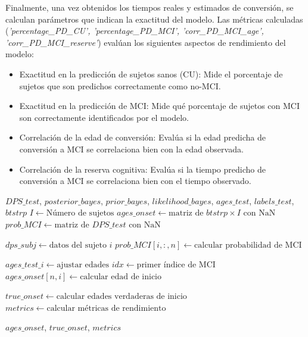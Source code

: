 Finalmente, una vez obtenidos los tiempos reales y estimados de conversión, se calculan parámetros que indican la exactitud del modelo. Las métricas calculadas (\textit{'percentage\_PD\_CU', 'percentage\_PD\_MCI', 'corr\_PD\_MCI\_age', 'corr\_PD\_MCI\_reserve'}) evalúan los siguientes aspectos de rendimiento del modelo:
\begin{itemize}
	\item Exactitud en la predicción de sujetos sanos (CU): Mide el porcentaje de sujetos que son predichos correctamente como no-MCI.
    \item Exactitud en la predicción de MCI: Mide qué porcentaje de sujetos con MCI son correctamente identificados por el modelo.
	\item Correlación de la edad de conversión: Evalúa si la edad predicha de conversión a MCI se correlaciona bien con la edad observada.
	\item Correlación de la reserva cognitiva: Evalúa si la tiempo predicho de conversión a MCI se correlaciona bien con el tiempo observado.
\end{itemize}

\begin{algorithm}
	\caption{Calcular Edad de Inicio del MCI con Leaspy}
	\begin{algorithmic}[1]
		\REQUIRE $DPS\_test$, $posterior\_bayes$, $prior\_bayes$, $likelihood\_bayes$, $ages\_test$, $labels\_test$, $btstrp$
		\STATE $I \gets \text{Número de sujetos}$
		\STATE $ages\_onset \gets \text{matriz de } btstrp \times I \text{ con NaN}$
		\STATE $prob\_MCI \gets \text{matriz de } DPS\_test \text{ con NaN}$
		
		\STATE $dps\_subj \gets \text{datos del sujeto } i$
		\STATE $prob\_MCI[i, :, n] \gets \text{calcular probabilidad de MCI}$
		\ENDFOR
		\ENDFOR
		
		\STATE $ages\_test\_i \gets \text{ajustar edades}$
		\STATE $idx \gets \text{primer índice de MCI}$
		\STATE $ages\_onset[n, i] \gets \text{calcular edad de inicio}$
		\ENDIF
		\ENDFOR
		\ENDFOR
		
		\STATE $true\_onset \gets \text{calcular edades verdaderas de inicio}$
		\STATE $metrics \gets \text{calcular métricas de rendimiento}$
		
		\RETURN $ages\_onset$, $true\_onset$, $metrics$
	\end{algorithmic}
\end{algorithm}

